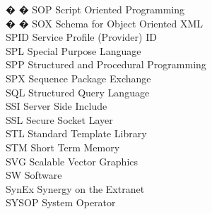 \begin{tabbing}
� � \>SOP \>\>Script Oriented Programming\\

� � \>SOX \>\>Schema for Object Oriented XML\\

    \>SPID \>\>Service Profile (Provider) ID\\

    \>SPL \>\>Special Purpose Language\\

    \>SPP \>\>Structured and Procedural Programming\\


    \>SPX \>\>Sequence Package Exchange\\

    \>SQL \>\>Structured Query Language\\



    \>SSI \>\>Server Side Include\\

    \>SSL \>\>Secure Socket Layer\\

    \>STL \>\>Standard Template Library\\

    \>STM \>\>Short Term Memory\\

    \>SVG \>\>Scalable Vector Graphics\\

    \>SW \>\>Software\\




    \>SynEx \>\>Synergy on the Extranet\\

    \>SYSOP \>\>System Operator\\


\end{tabbing}
